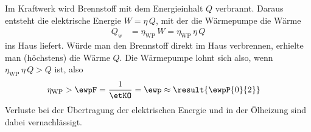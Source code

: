 Im Kraftwerk wird Brennstoff mit dem Energieinhalt $Q$ verbrannt. Daraus entsteht die elektrische Energie $W = \eta\,Q$, mit der die Wärmepumpe die Wärme
\begin{align}
 Q_\text{w} &= \eta_\text{WP}\,W = \eta_\text{WP}\,\eta\,Q
\end{align}
ins Haus liefert. Würde man den Brennstoff direkt im Haus verbrennen, erhielte man (höchstens) die Wärme $Q$. Die Wärmepumpe lohnt sich also, wenn $\eta_\text{WP}\,\eta\,Q > Q$ ist, also
\begin{align}
 \eta_\text{WP} &> \ewpF = \frac{1}{\etKO} = \ewp \approx \result{\ewpP{0}{2}}
\end{align}
Verluste bei der Übertragung der elektrischen Energie und in der Ölheizung sind dabei vernachlässigt.
